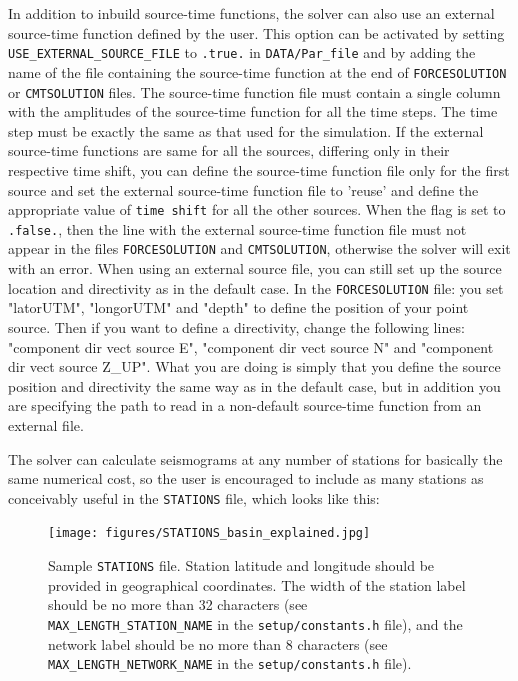 In addition to inbuild source-time functions, the solver can also use an external source-time function defined by the user. This option can be activated by setting \texttt{USE\_EXTERNAL\_SOURCE\_FILE} to \texttt{.true.} in \texttt{DATA/Par\_file} and by adding the name of the file containing the source-time function at the end of \texttt{FORCESOLUTION} or \texttt{CMTSOLUTION} files.
The source-time function file must contain a single column with the amplitudes of the source-time function for all the time steps. The time step must be exactly the same as that used for the simulation. If the external source-time functions are same for all the sources, differing only in their respective time shift, you can define the source-time function file only for the first source and set the external source-time function file to 'reuse' and define the appropriate value of \texttt{time shift} for all the other sources. When the flag is set to \texttt{.false.}, then the line with the external source-time function file must not appear in the files \texttt{FORCESOLUTION} and \texttt{CMTSOLUTION}, otherwise the solver will exit with an error. When using an external source file, you can still set up the source location and directivity as in the default case.
In the \texttt{FORCESOLUTION} file: you set "latorUTM", "longorUTM" and "depth" to define the position of your point source. Then if you want to define a directivity, change the following lines: "component dir vect source E", "component dir vect source N" and "component dir vect source Z\_UP". What you are doing is simply that you define the source position and directivity the same way as in the default case, but in addition you are specifying the path to read in a non-default source-time function from an external file.

\vspace{1cm}

The solver can calculate seismograms at any number of stations for
basically the same numerical cost, so the user is encouraged to include
as many stations as conceivably useful in the \texttt{STATIONS} file,
which looks like this:
%
\begin{figure}[H]
\begin{centering}
\texttt{[image: figures/STATIONS\_basin\_explained.jpg]}
\par
\end{centering}
\caption{Sample \texttt{STATIONS} file. Station latitude and longitude should
be provided in geographical coordinates. The width of the station
label should be no more than 32 characters (see \texttt{MAX\_LENGTH\_STATION\_NAME}
in the \texttt{setup/constants.h} file), and the network label should be
no more than 8 characters (see \texttt{MAX\_LENGTH\_NETWORK\_NAME}
in the \texttt{setup/constants.h} file).}
\label{fig:Sample-STATIONS-file.}
\end{figure}


